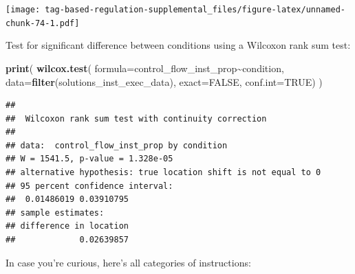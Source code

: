 \documentclass[
]{book}
\newenvironment{Shaded}{\begin{snugshade}}{\end{snugshade}}
\newcommand{\DataTypeTok}[1]{\textcolor[rgb]{0.13,0.29,0.53}{#1}}
\newcommand{\KeywordTok}[1]{\textcolor[rgb]{0.13,0.29,0.53}{\textbf{#1}}}
\newcommand{\NormalTok}[1]{#1}
\newcommand{\OperatorTok}[1]{\textcolor[rgb]{0.81,0.36,0.00}{\textbf{#1}}}
\newcommand{\OtherTok}[1]{\textcolor[rgb]{0.56,0.35,0.01}{#1}}
\begin{document}
\texttt{[image: tag-based-regulation-supplemental\_files/figure-latex/unnamed-chunk-74-1.pdf]}

Test for significant difference between conditions using a Wilcoxon rank sum test:

\begin{Shaded}
\begin{Highlighting}[]
\KeywordTok{print}\NormalTok{(}
  \KeywordTok{wilcox.test}\NormalTok{(}
    \DataTypeTok{formula=}\NormalTok{control\_flow\_inst\_prop}\OperatorTok{\textasciitilde{}}\NormalTok{condition,}
    \DataTypeTok{data=}\KeywordTok{filter}\NormalTok{(solutions\_inst\_exec\_data),}
    \DataTypeTok{exact=}\OtherTok{FALSE}\NormalTok{,}
    \DataTypeTok{conf.int=}\OtherTok{TRUE}\NormalTok{)}
\NormalTok{)}
\end{Highlighting}
\end{Shaded}

\begin{verbatim}
## 
##  Wilcoxon rank sum test with continuity correction
## 
## data:  control_flow_inst_prop by condition
## W = 1541.5, p-value = 1.328e-05
## alternative hypothesis: true location shift is not equal to 0
## 95 percent confidence interval:
##  0.01486019 0.03910795
## sample estimates:
## difference in location 
##             0.02639857
\end{verbatim}

In case you're curious, here's all categories of instructions:
\end{document}
